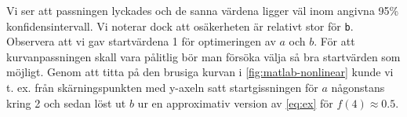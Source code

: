 Vi ser att passningen lyckades och de sanna värdena ligger väl inom
angivna 95\%  konfidensintervall. Vi noterar dock att osäkerheten är
relativt stor för {\tt b}. Observera att vi gav startvärdena 1 för
optimeringen av $a$ och $b$. För att kurvanpassningen skall vara pålitlig
bör man försöka välja så bra startvärden som möjligt. Genom att titta på
den brusiga kurvan i \cref{fig:matlab-nonlinear} kunde vi t. ex. från
skärningspunkten med y-axeln satt startgissningen för $a$ någonstans
kring 2 och sedan löst ut $b$ ur en approximativ version av \cref{eq:ex} för
$f(4) \approx 0.5$.

